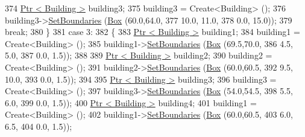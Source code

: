 \begin{DoxyCode}
374                         \hyperlink{classns3_1_1Ptr}{Ptr < Building >} building3;
375                         building3 = Create<Building> ();
376                         building3->\hyperlink{classns3_1_1Building_a4b69659f05a983f06e33e7db62415915}{SetBoundaries} (\hyperlink{classns3_1_1Box}{Box} (60.0,64.0,
377                                                                                 10.0, 11.0,
378                                                                                 0.0, 15.0));
379                         \textcolor{keywordflow}{break};
380                 \}
381                 \textcolor{keywordflow}{case} 3:
382                 \{
383                         \hyperlink{classns3_1_1Ptr}{Ptr < Building >} building1;
384                         building1 = Create<Building> ();
385                         building1->\hyperlink{classns3_1_1Building_a4b69659f05a983f06e33e7db62415915}{SetBoundaries} (\hyperlink{classns3_1_1Box}{Box} (69.5,70.0,
386                                                                                 4.5, 5.0,
387                                                                                 0.0, 1.5));
388 
389                         \hyperlink{classns3_1_1Ptr}{Ptr < Building >} building2;
390                         building2 = Create<Building> ();
391                         building2->\hyperlink{classns3_1_1Building_a4b69659f05a983f06e33e7db62415915}{SetBoundaries} (\hyperlink{classns3_1_1Box}{Box} (60.0,60.5,
392                                                                                 9.5, 10.0,
393                                                                                 0.0, 1.5));
394 
395                         \hyperlink{classns3_1_1Ptr}{Ptr < Building >} building3;
396                         building3 = Create<Building> ();
397                         building3->\hyperlink{classns3_1_1Building_a4b69659f05a983f06e33e7db62415915}{SetBoundaries} (\hyperlink{classns3_1_1Box}{Box} (54.0,54.5,
398                                                                                 5.5, 6.0,
399                                                                                 0.0, 1.5));
400                         \hyperlink{classns3_1_1Ptr}{Ptr < Building >} building4;
401                         building1 = Create<Building> ();
402                         building1->\hyperlink{classns3_1_1Building_a4b69659f05a983f06e33e7db62415915}{SetBoundaries} (\hyperlink{classns3_1_1Box}{Box} (60.0,60.5,
403                                                                                 6.0, 6.5,
404                                                                                 0.0, 1.5));

\end{DoxyCode}

